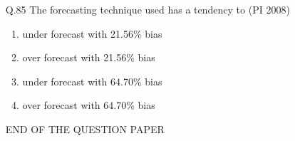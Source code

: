\documentclass[journal,12pt,onecolumn]{IEEEtran}
\theoremstyle{remark}
\begin{document}
\begin{enumerate}
    \item[\textnormal{Q.85}] The forecasting technique used has a tendency to \hfill{(PI 2008)} 
    \begin{enumerate}[label=(\Alph*)]
        \item under forecast with 21.56\% bias
        \item over forecast with 21.56\% bias
        \item under forecast with 64.70\% bias
        \item over forecast with 64.70\% bias
    \end{enumerate}
\vspace{6cm}
{END OF THE QUESTION PAPER}


























    




    
    \end{enumerate}
\end{document}
